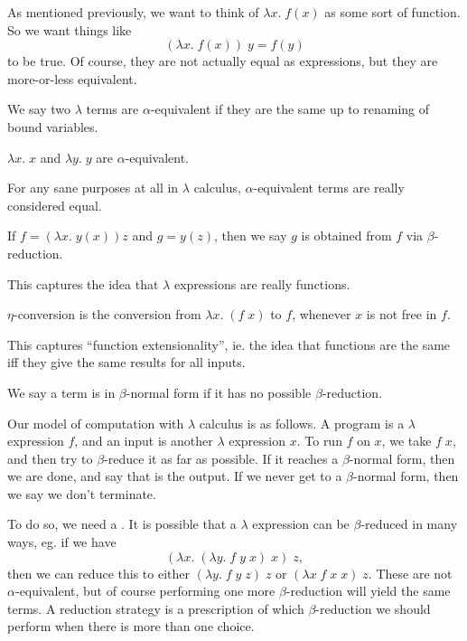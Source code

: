 \documentclass[a4paper]{article}
\begin{document}
As mentioned previously, we want to think of $\lambda x.\; f(x)$ as some sort of function. So we want things like
\[
  (\lambda x.\; f(x))\; y = f(y)
\]
to be true. Of course, they are not actually equal as expressions, but they are more-or-less equivalent.
\begin{defi}
  We say two $\lambda$ terms are $\alpha$-equivalent if they are the same up to renaming of bound variables.
\end{defi}

\begin{eg}
  $\lambda x.\; x$ and $\lambda y.\; y$ are $\alpha$-equivalent.
\end{eg}
For any sane purposes at all in $\lambda$ calculus, $\alpha$-equivalent terms are really considered equal.

\begin{defi}
  If $f = (\lambda x.\; y(x)) z$ and $g = y(z)$, then we say $g$ is obtained from $f$ via $\beta$-reduction.
\end{defi}
This captures the idea that $\lambda$ expressions are really functions.

\begin{defi}
  $\eta$-conversion is the conversion from $\lambda x.\; (f\; x)$ to $f$, whenever $x$ is not free in $f$.
\end{defi}
This captures ``function extensionality'', ie. the idea that functions are the same iff they give the same results for all inputs. %

\begin{defi}
  We say a term is in $\beta$-normal form if it has no possible $\beta$-reduction.
\end{defi}
Our model of computation with $\lambda$ calculus is as follows. A program is a $\lambda$ expression $f$, and an input is another $\lambda$ expression $x$. To run $f$ on $x$, we take $f\; x$, and then try to $\beta$-reduce it as far as possible. If it reaches a $\beta$-normal form, then we are done, and say that is the output. If we never get to a $\beta$-normal form, then we say we don't terminate.

To do so, we need a . It is possible that a $\lambda$ expression can be $\beta$-reduced in many ways, eg. if we have
\[
  (\lambda x.\; (\lambda y.\; f\;y\; x)\;x)\;z,
\]
then we can reduce this to either $(\lambda y.\; f\; y\; z)\; z$ or $(\lambda x\; f\; x\; x)\; z$. These are not $\alpha$-equivalent, but of course performing one more $\beta$-reduction will yield the same terms. A reduction strategy is a prescription of which $\beta$-reduction we should perform when there is more than one choice.
\end{document}
